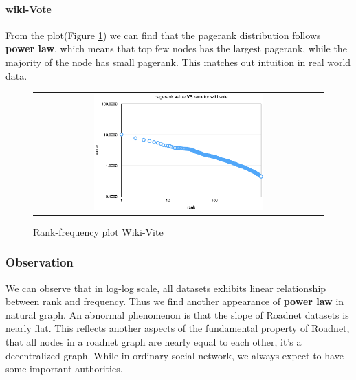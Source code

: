 \paragraph{wiki-Vote}
From the plot(Figure \ref{t2:wikivote}) we can find that the pagerank distribution follows {\bf power law}, which means that top few nodes has the largest pagerank, while the majority of the node has small pagerank. This matches out intuition in real world data. 
\begin{figure}[!htbf]
\begin{center}
\begin{tabular}{c}
    \includegraphics[width=0.6\textwidth]{FIG/t2_wikivote.png}
\end{tabular}
\caption{Rank-frequency plot Wiki-Vite}
\label{t2:wikivote}
\end{center}
\end{figure}


\subsubsection{Observation}
We can observe that in log-log scale, all datasets exhibits linear relationship between rank and frequency. Thus we find another appearance of {\bf power law} in natural graph. An abnormal phenomenon is that the slope of Roadnet datasets is nearly flat. This reflects another aspects of the fundamental property of Roadnet, that all nodes in a roadnet graph are nearly equal to each other, it's a decentralized graph. While in ordinary social network, we always expect to have some important authorities. 




